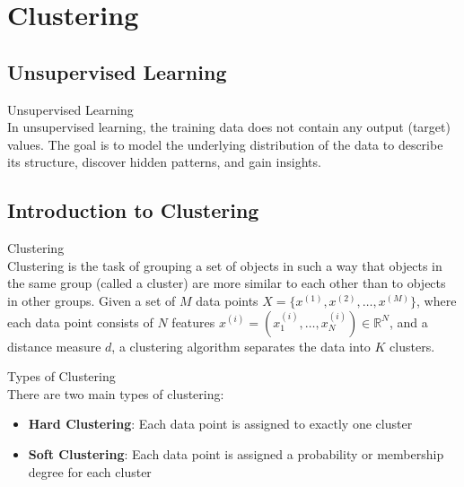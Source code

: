 \section{Clustering}

\subsection{Unsupervised Learning}

\begin{definition}{Unsupervised Learning}\\
In unsupervised learning, the training data does not contain any output (target) values. The goal is to model the underlying distribution of the data to describe its structure, discover hidden patterns, and gain insights.
\end{definition}

\subsection{Introduction to Clustering}

\begin{definition}{Clustering}\\
Clustering is the task of grouping a set of objects in such a way that objects in the same group (called a cluster) are more similar to each other than to objects in other groups. Given a set of $M$ data points $X = \{x^{(1)}, x^{(2)}, \ldots, x^{(M)}\}$, where each data point consists of $N$ features $x^{(i)} = (x^{(i)}_1, \ldots, x^{(i)}_N) \in \mathbb{R}^N$, and a distance measure $d$, a clustering algorithm separates the data into $K$ clusters.
\end{definition}

\begin{concept}{Types of Clustering}\\
There are two main types of clustering:
\begin{itemize}
    \item \textbf{Hard Clustering}: Each data point is assigned to exactly one cluster
    \item \textbf{Soft Clustering}: Each data point is assigned a probability or membership degree for each cluster
\end{itemize}
\end{concept}

